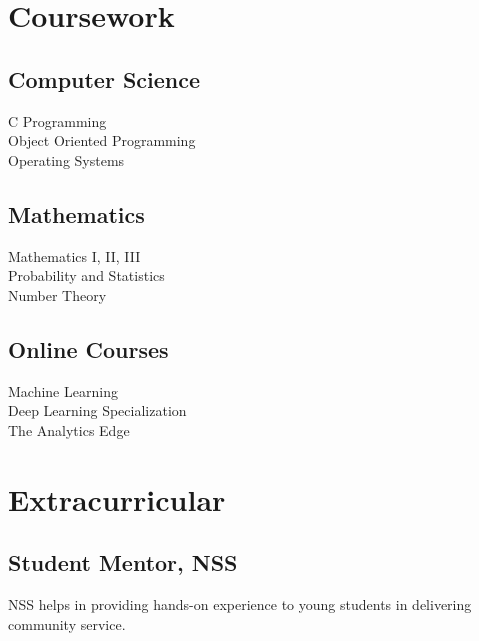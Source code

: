 \documentclass[]{plushcv}
\begin{document}
\begin{minipage}[t]{0.25\textwidth}


 \section{Coursework}

 \subsection{Computer Science}
 C Programming \textbullet{}\\ 
 Object Oriented Programming \textbullet{}\\ 
 Operating Systems 
 \sectionsep

 \subsection{Mathematics}
 Mathematics I, II, III \textbullet{}\\
 Probability and Statistics \textbullet{}\\
 Number Theory
  \sectionsep
 
 \subsection{Online Courses}
 Machine Learning \textbullet{}\\ 
 Deep Learning Specialization \textbullet{}\\ 
 The Analytics Edge 
   \sectionsep

 
\section{Extracurricular}
 \subsection{Student Mentor, NSS}
 NSS helps in providing hands-on experience to young students in delivering community service.
 


\end{minipage} 
\end{document}
